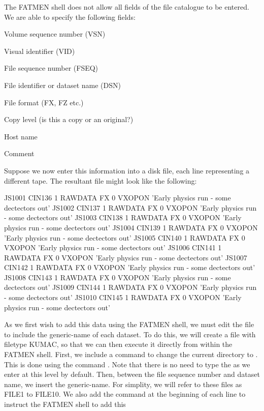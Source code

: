 The FATMEN shell does not allow all fields of the file catalogue
to be entered. We are able to specify the following fields:
\begin{OL}
\item
Volume sequence number (VSN)
\item
Visual identifier (VID)
\item
File sequence number (FSEQ)
\item
File identifier or dataset name (DSN)
\item
File format (FX, FZ etc.)
\item
Copy level (is this a copy or an original?)
\item
Host name
\item
Comment
\end{OL}
\par
Suppose we now enter this information into a disk file, each line
representing a different tape. The resultant file might look
like the following:
\begin{XMP}
JS1001 CIN136 1 RAWDATA FX 0 VXOPON 'Early physics run - some dectectors out'
JS1002 CIN137 1 RAWDATA FX 0 VXOPON 'Early physics run - some dectectors out'
JS1003 CIN138 1 RAWDATA FX 0 VXOPON 'Early physics run - some dectectors out'
JS1004 CIN139 1 RAWDATA FX 0 VXOPON 'Early physics run - some dectectors out'
JS1005 CIN140 1 RAWDATA FX 0 VXOPON 'Early physics run - some dectectors out'
JS1006 CIN141 1 RAWDATA FX 0 VXOPON 'Early physics run - some dectectors out'
JS1007 CIN142 1 RAWDATA FX 0 VXOPON 'Early physics run - some dectectors out'
JS1008 CIN143 1 RAWDATA FX 0 VXOPON 'Early physics run - some dectectors out'
JS1009 CIN144 1 RAWDATA FX 0 VXOPON 'Early physics run - some dectectors out'
JS1010 CIN145 1 RAWDATA FX 0 VXOPON 'Early physics run - some dectectors out'
\end{XMP}
\par
As we first wish to add this data using the FATMEN shell,
we must edit the file to include the generic-name of each dataset.
To do this, we will create a file with filetype KUMAC, so that
we can then execute it directly from within the FATMEN shell.
First, we include a command to change the current directory
to . 
This is done using the command .
 Note that there is no need to type the
 as we enter at this level by default.
Then, between the file sequence number and dataset name, we insert
the generic-name. For simplity, we will refer to these files
as FILE1 to FILE10. 
We also add the command  at
the beginning of each line to instruct the FATMEN shell to add this
